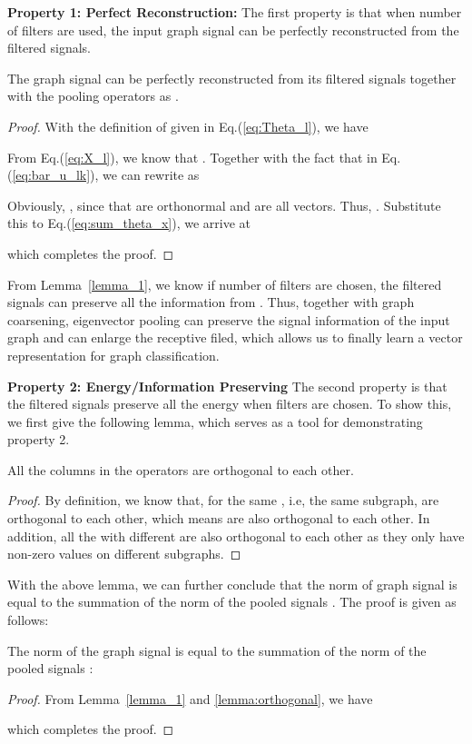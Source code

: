 \documentclass[sigconf]{acmart}
\begin{document}
\vspace{0.5em}
\noindent{}\textbf{Property 1: Perfect Reconstruction:} The first property is that when  number of filters are used, the input graph signal can be perfectly reconstructed from the filtered signals.
\begin{lemma} \label{lemma_1}
The graph signal  can be perfectly reconstructed from its filtered signals  together with the pooling operators  as .
\end{lemma}
\vspace{-1em}
\begin{proof}
With the definition of  given in Eq.(\ref{eq:Theta_l}), we have

From Eq.(\ref{eq:X_l}), we know that . Together with the fact that  in Eq.(\ref{eq:bar_u_lk}), we can rewrite   as 

Obviously, , since that  are orthonormal and  are all  vectors. Thus, . Substitute this to Eq.(\ref{eq:sum_theta_x}), we arrive at

which completes the proof.

\end{proof}
From Lemma~\ref{lemma_1}, we know if  number of filters are chosen, the filtered signals  can preserve all the information from . Thus, together with graph coarsening, eigenvector pooling can preserve the signal information of the input graph and can enlarge the receptive filed, which allows us to finally learn a vector representation for graph classification. 

\vspace{0.5em}
\noindent{}\textbf{Property 2: Energy/Information Preserving} The second property is that the filtered signals preserve all the energy when  filters are chosen. To show this, we first give the following lemma, which serves as a tool for demonstrating property 2.
\begin{lemma} \label{lemma:orthogonal}
All the columns in the operators  are orthogonal to each other.
\end{lemma}
\vspace{-1em}
\begin{proof}
    By definition, we know that, for the same , i.e, the same subgraph,  are orthogonal to each other, which means  are also orthogonal to each other. In addition, all the  with different  are also orthogonal to each other as they only have non-zero values on different subgraphs. 
\end{proof}

With the above lemma, we can further conclude that the  norm of graph signal  is equal to the summation of the  norm of the pooled signals . The proof is given as follows:
\begin{lemma} \label{lemma:l_2 norm}
The  norm of the graph signal  is equal to the summation of the  norm of the pooled signals :

\end{lemma}\label{lem:reconstruction}
\vspace{-1em}
\begin{proof}
From Lemma~\ref{lemma_1} and \ref{lemma:orthogonal}, we have

which completes the proof.
\end{proof}
\end{document}
